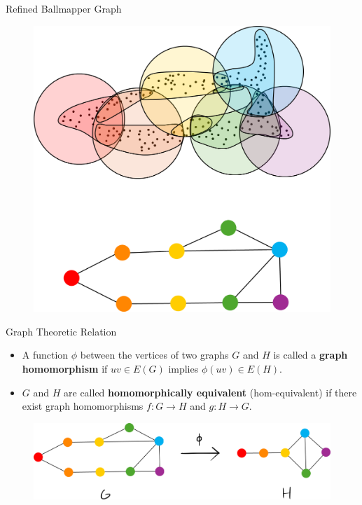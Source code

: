 \documentclass{beamer}
\begin{document}
\begin{frame}{Refined Ballmapper Graph}
  \begin{figure}
    \begin{center}
      \includegraphics[width=.75\textwidth]{refinedballmapper.png}
    \end{center}
  \end{figure}
\end{frame}

\begin{frame}{Graph Theoretic Relation}
  \begin{itemize}
    \item A function $\phi$ between the vertices of two graphs $G$ and $H$ is called a \textbf{graph homomorphism} if $uv\in E(G)$ implies $\phi(uv)\in E(H)$.
    \item $G$ and $H$ are called \textbf{homomorphically equivalent} (hom-equivalent) if there exist graph homomorphisms $f: G\to H$ and $g: H\to G$.
  \end{itemize}
  \begin{figure}
    \begin{center}
      \includegraphics[width=1\textwidth]{graphhomo.png}
    \end{center}
  \end{figure}
\end{frame}
\end{document}
